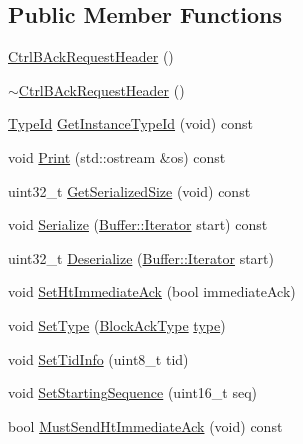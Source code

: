 \subsection*{Public Member Functions}
\begin{DoxyCompactItemize}
\item 
\hyperlink{classns3_1_1CtrlBAckRequestHeader_a816f6247d21a71b4cfa5eebb8359ced8}{Ctrl\+B\+Ack\+Request\+Header} ()
\item 
\hyperlink{classns3_1_1CtrlBAckRequestHeader_a4ac4fa589d79f58741b4970fde84ad6f}{$\sim$\+Ctrl\+B\+Ack\+Request\+Header} ()
\item 
\hyperlink{classns3_1_1TypeId}{Type\+Id} \hyperlink{classns3_1_1CtrlBAckRequestHeader_a7643ad78a905be98007bc0d60a8ffd65}{Get\+Instance\+Type\+Id} (void) const 
\item 
void \hyperlink{classns3_1_1CtrlBAckRequestHeader_a9920f36815c4f5707c19dd0caf514661}{Print} (std\+::ostream \&os) const 
\item 
uint32\+\_\+t \hyperlink{classns3_1_1CtrlBAckRequestHeader_a7b65704abc7f2d54e05a44104f06e5b6}{Get\+Serialized\+Size} (void) const 
\item 
void \hyperlink{classns3_1_1CtrlBAckRequestHeader_aa03875095d9e42809d799ffd2ffdde7d}{Serialize} (\hyperlink{classns3_1_1Buffer_1_1Iterator}{Buffer\+::\+Iterator} start) const 
\item 
uint32\+\_\+t \hyperlink{classns3_1_1CtrlBAckRequestHeader_a3a09d762665b8928b3457e6c0e67ad82}{Deserialize} (\hyperlink{classns3_1_1Buffer_1_1Iterator}{Buffer\+::\+Iterator} start)
\item 
void \hyperlink{classns3_1_1CtrlBAckRequestHeader_aa501027817022945752c8ca90392a7fc}{Set\+Ht\+Immediate\+Ack} (bool immediate\+Ack)
\item 
void \hyperlink{classns3_1_1CtrlBAckRequestHeader_a2de2783f9b09f03bbb16a0270ed8340f}{Set\+Type} (\hyperlink{namespacens3_a90f436472d19d7d7f37cbf0b8c288ff7}{Block\+Ack\+Type} \hyperlink{visualizer-ideas_8txt_add98db9e15e2a58cf2b57623e7aa893a}{type})
\item 
void \hyperlink{classns3_1_1CtrlBAckRequestHeader_aaaf130ca02fc6005d69a5592ea7f9ab3}{Set\+Tid\+Info} (uint8\+\_\+t tid)
\item 
void \hyperlink{classns3_1_1CtrlBAckRequestHeader_aa96ccb301ad5897945d80fefce324a00}{Set\+Starting\+Sequence} (uint16\+\_\+t seq)
\item 
bool \hyperlink{classns3_1_1CtrlBAckRequestHeader_adf8bac631d8c524a6e0221f1aafe1fb1}{Must\+Send\+Ht\+Immediate\+Ack} (void) const 
\item 

\end{DoxyCompactItemize}
